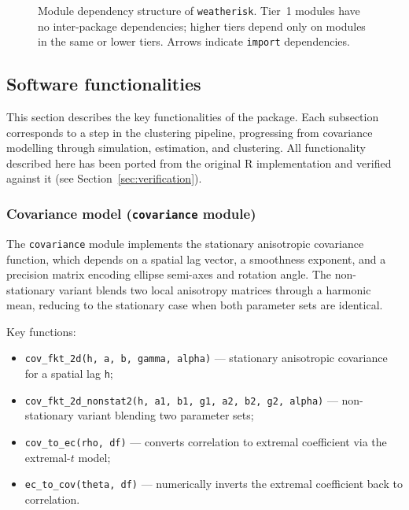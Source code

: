 \documentclass[a4paper]{elsarticle}
\begin{document}
\begin{figure}[ht]
{%
}%
\caption{Module dependency structure of \texttt{weatherisk}.
  Tier~1 modules have no inter-package dependencies;
  higher tiers depend only on modules in the same or lower tiers.
  Arrows indicate \texttt{import} dependencies.}
\label{fig:architecture}
\end{figure}

\subsection{Software functionalities}
\label{sec:functionalities}

This section describes the key functionalities of the package.
Each subsection corresponds to a step in the clustering pipeline,
progressing from covariance modelling through simulation, estimation,
and clustering.  All functionality described here has been ported
from the original R implementation and verified against it (see
Section~\ref{sec:verification}).

\subsubsection{Covariance model (\texttt{covariance} module)}

The \texttt{covariance} module implements the stationary anisotropic
covariance function, which depends on a spatial lag vector, a
smoothness exponent, and a precision matrix encoding ellipse semi-axes
and rotation angle.  The non-stationary variant blends two local
anisotropy matrices through a harmonic mean, reducing to the
stationary case when both parameter sets are identical.

Key functions:
\begin{itemize}
\item \texttt{cov\_fkt\_2d(h, a, b, gamma, alpha)} --- stationary
  anisotropic covariance for a spatial lag \texttt{h};
\item \texttt{cov\_fkt\_2d\_nonstat2(h, a1, b1, g1, a2, b2, g2,
  alpha)} --- non-stationary variant blending two parameter sets;
\item \texttt{cov\_to\_ec(rho, df)} --- converts correlation to
  extremal coefficient via the extremal-$t$ model;
\item \texttt{ec\_to\_cov(theta, df)} --- numerically inverts the
  extremal coefficient back to correlation.
\end{itemize}
\end{document}
